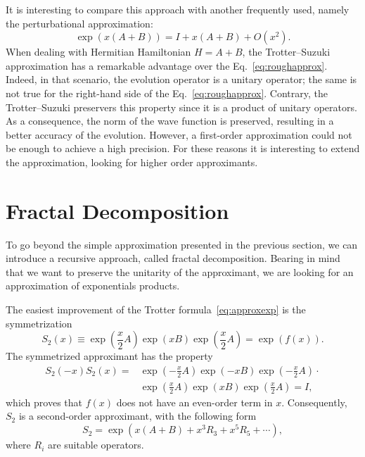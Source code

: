 It is interesting to compare this approach with another frequently used, namely the perturbational approximation:
\begin{equation} \label{eq:roughapprox}
\exp\left({x(A+B)}\right) = I + x(A+B) + O(x^2).
\end{equation}
When dealing with Hermitian Hamiltonian $H=A+B$, the Trotter--Suzuki approximation has a remarkable advantage over the Eq.~\eqref{eq:roughapprox}. Indeed, in that scenario, the evolution operator is a unitary operator; the same is not true for the right-hand side of the Eq.~\eqref{eq:roughapprox}. Contrary, the Trotter--Suzuki preservers this property since it is a product of unitary operators. As a consequence, the norm of the wave function is preserved, resulting in a better accuracy of the evolution. However, a first-order approximation could not be enough  to achieve a high precision. For these reasons it is interesting to extend the approximation, looking for higher order approximants.

\section{Fractal Decomposition}
To go beyond the simple approximation presented in the previous section, we can introduce a recursive approach, called fractal decomposition. Bearing in mind that we want to preserve the unitarity of the approximant, we are looking for an approximation of exponentials products.

The easiest improvement of the Trotter formula~\eqref{eq:approxexp} is the symmetrization
\begin{equation} 
S_2(x) \equiv \exp\left({\frac{x}{2}A}\right) \exp\left({xB}\right) \exp\left({\frac{x}{2}A}\right) = \exp\left({f(x)}\right).
\end{equation}
The symmetrized approximant has the property
\begin{align}
S_2(-x) S_2(x) = & \exp\left({-\frac{x}{2}A}\right) \exp\left({-xB}\right) \exp\left({-\frac{x}{2}A}\right) \cdot \nonumber \\ & \exp\left({\frac{x}{2}A}\right) \exp\left({xB}\right) \exp\left({\frac{x}{2}A}\right) = I, \nonumber
\end{align}
which proves that $f(x)$ does not have an even-order term in $x$. Consequently, $S_2$ is a second-order approximant, with the following form
\begin{equation} \label{eq:S2-form}
S_2 = \exp\left({x(A+B) + x^3R_3 + x^5R_5 + \cdots}\right),
\end{equation}
where $R_i$ are suitable operators.

